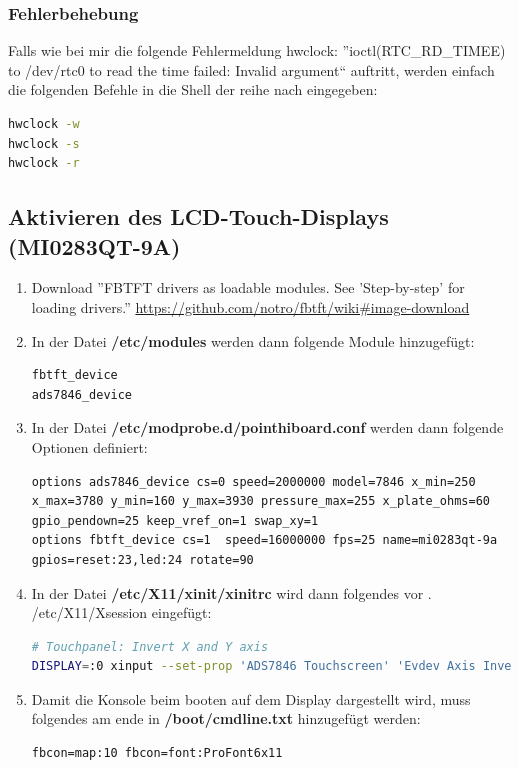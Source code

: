 \documentclass[a4paper,10pt]{article}
\newcommand{\path}[1]{\textcolor{pathcolor}{\textbf{#1}}} %
\begin{document}
\subsubsection{Fehlerbehebung}

Falls wie bei mir die folgende Fehlermeldung hwclock: ''ioctl(RTC\_RD\_TIMEE) to /dev/rtc0 to read the time failed: Invalid argument`` auftritt, werden einfach die folgenden Befehle in die Shell der reihe nach eingegeben:
\begin{lstlisting}[language=sh]
hwclock -w
hwclock -s
hwclock -r
\end{lstlisting}

\subsection{Aktivieren des LCD-Touch-Displays (MI0283QT-9A)}
\let\thefootnote\relax{}
\let\thefootnote\relax{}
\let\thefootnote\relax{}

\begin{enumerate}
 \item Download ''FBTFT drivers as loadable modules. See 'Step-by-step' for loading drivers.'' \url{https://github.com/notro/fbtft/wiki#image-download}
 \item In der Datei \path{/etc/modules} werden dann folgende Module hinzugefügt:
    \begin{lstlisting}
fbtft_device
ads7846_device
    \end{lstlisting}
 \item In der Datei \path{/etc/modprobe.d/pointhiboard.conf} werden dann folgende Optionen definiert:
    \begin{lstlisting}
options ads7846_device cs=0 speed=2000000 model=7846 x_min=250 x_max=3780 y_min=160 y_max=3930 pressure_max=255 x_plate_ohms=60 gpio_pendown=25 keep_vref_on=1 swap_xy=1 
options fbtft_device cs=1  speed=16000000 fps=25 name=mi0283qt-9a gpios=reset:23,led:24 rotate=90
    \end{lstlisting}
 \item In der Datei \path{/etc/X11/xinit/xinitrc} wird dann folgendes vor . /etc/X11/Xsession eingefügt:
    \begin{lstlisting}[language=sh]
# Touchpanel: Invert X and Y axis
DISPLAY=:0 xinput --set-prop 'ADS7846 Touchscreen' 'Evdev Axis Inversion' 1 1
    \end{lstlisting}
 \item Damit die Konsole beim booten auf dem Display dargestellt wird, muss folgendes am ende in \path{/boot/cmdline.txt} hinzugefügt werden:
    \begin{lstlisting}
fbcon=map:10 fbcon=font:ProFont6x11
    \end{lstlisting}
\end{enumerate}
\end{document}
